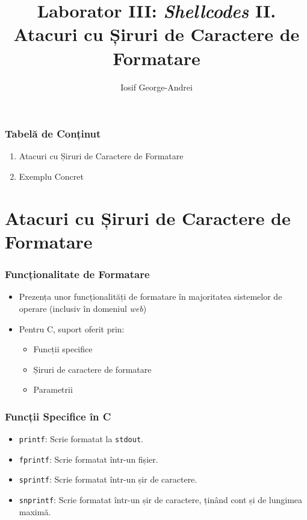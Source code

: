 \documentclass[xcolor={table}]{beamer}
\title{Laborator III: \textit{Shellcodes} II. Atacuri cu Șiruri de Caractere de Formatare}
\subtitle{}
\author{Iosif George-Andrei}
\begin{document}
    \setcounter{showProgressBar}{0}
	\setcounter{showSlideNumbers}{0}
	\frame{\titlepage}

	\begin{frame}
		\frametitle{Tabelă de Conținut}\pause
		\begin{enumerate}[<+->]
			\item Atacuri cu Șiruri de Caractere de Formatare
			\item Exemplu Concret
		\end{enumerate}
	\end{frame}

	\setcounter{framenumber}{0}
	\setcounter{showProgressBar}{1}
	\setcounter{showSlideNumbers}{1}
	\section{Atacuri cu Șiruri de Caractere de Formatare}

	\begin{frame}
		\frametitle{Funcționalitate de Formatare}\pause
		\begin{itemize}[<+->]
		    \item Prezența unor funcționalități de formatare în majoritatea sistemelor de operare (inclusiv în domeniul \textit{web})
			\item Pentru C, suport oferit prin:
			    \begin{itemize}
			        \item Funcții specifice
			        \item Șiruri de caractere de formatare
			        \item Parametrii
			    \end{itemize}
		\end{itemize}
	\end{frame}
	
	\begin{frame}
		\frametitle{Funcții Specifice în C}\pause
		\begin{itemize}[<+->]
			\item \texttt{printf}: Scrie formatat la \texttt{stdout}.
			\item \texttt{fprintf}: Scrie formatat într-un fișier.
			\item \texttt{sprintf}: Scrie formatat într-un șir de caractere.
			\item \texttt{snprintf}: Scrie formatat într-un șir de caractere, ținând cont și de lungimea maximă.
		\end{itemize}
	\end{frame}
	
\end{document}
